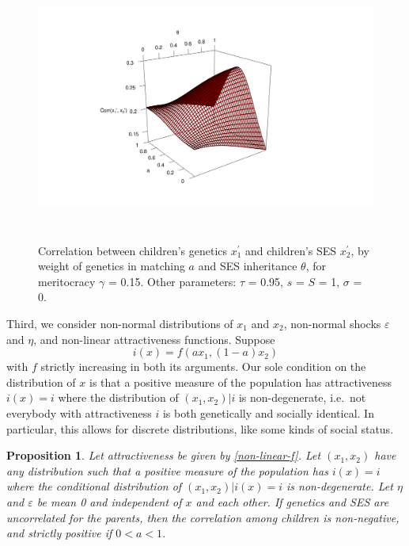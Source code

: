 \documentclass[
]{article}
\newtheorem{proposition}{Proposition}
\theoremstyle{definition}
\theoremstyle{definition}
\theoremstyle{definition}
\theoremstyle{definition}
\theoremstyle{remark}
\begin{document}
\begin{figure}

{\centering \includegraphics[height=3.5in]{trading-genetics_files/figure-latex/pic-gamma-2-rgl} 

}

\caption{Correlation between children's genetics $x^\prime_1$ and children's SES $x^\prime_2$, by weight of genetics in matching $a$ and SES inheritance $\theta$, for meritocracy $\gamma$ = 0.15. Other parameters: $\tau$ = 0.95, $s$ = $S$ = 1, $\sigma$ = 0.}\label{fig:pic-gamma}
\end{figure}

Third, we consider non-normal distributions of \(x_1\) and \(x_2\), non-normal
shocks \(\varepsilon\) and \(\eta\), and non-linear attractiveness functions. Suppose
\begin{equation}\label{non-linear-f} 
i(x) = f(ax_1, (1-a)x_2) 
\end{equation}
with \(f\) strictly increasing in both its arguments. Our sole condition on the
distribution of \(x\) is that a positive measure of the population has
attractiveness \(i(x) = i\) where the distribution of \((x_1, x_2)|i\) is
non-degenerate, i.e.~not everybody with attractiveness \(i\) is both genetically
and socially identical. In particular, this allows for discrete distributions,
like some kinds of social status.

\begin{proposition}\label{prop-non-normal}
Let attractiveness be given by \eqref{non-linear-f}. Let $(x_1, x_2)$ have
any distribution such that a positive measure of the population has
$i(x) = i$ where the conditional distribution of $(x_1, x_2)|i(x) = i$ is 
non-degenerate. Let $\eta$ and $\varepsilon$ be mean 0 and independent of
$x$ and each other. If genetics and SES are uncorrelated for the parents, then
the correlation among children is non-negative, and strictly positive if 
$0 < a < 1$.
\end{proposition}
\end{document}

